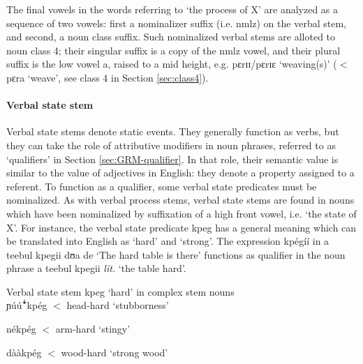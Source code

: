 \begin{exe}
\begin{exe}
\begin{exe}
{\begin{exe}
\begin{exe}
\begin{exe}
\begin{exe}
 The final vowels in the
words referring to `the process of X' are analyzed as a sequence of two
vowels: first a nominalizer suffix (i.e. {\sc nmlz})  on the verbal stem,  and
second,  a noun class suffix.  Such nominalized verbal stems are alloted to
noun class 4;  their singular suffix is a copy of the {\sc nmlz} vowel,
and their  plural suffix is the low vowel {\sls a}, raised to a mid height, e.g.
{\sls pɛrɪɪ}/{\sls pɛrɪɛ} `weaving(s)'  ($<$ {\sls pɛra} `weave', see class 4
in Section \ref{sec:class4}).



\paragraph{Verbal state stem}
\label{sec:GRM-verb-state-stem}

Verbal state stems  denote static events. They generally
function  as verbs, but they can take the role of attributive modifiers in
noun phrases, referred to as  `qualifiers' in Section \ref{sec:GRM-qualifier}.
In that role, their semantic value is similar to the value of adjectives in
English: they denote a property  assigned to a referent.  To function as  a
qualifier, some verbal state predicates must be nominalized. As with verbal 
process stems,  verbal state stems are found in nouns which
have
been nominalized by suffixation of a  high front vowel, i.e. `the state of X'.
For instance, the verbal state predicate {\sls kpeg} has a general meaning 
which 
can be
translated into English as `hard' and `strong'. The expression {\sls kpégíí} 
in
{\sls a teebul kpegii dʊa de} `The hard table is there' functions as qualifier in
the noun phrase {\sls a teebul kpegii} {\it lit.} `the table hard'. 


\ea\label{exːGRM-v-sta-p-hard}{\rm Verbal state stem {\sls kpeg}  `hard' in
complex stem nouns}\\
 
 \ea\label{exːGRM-v-sta-p-hard-head}
{ɲúú{\T ꜜ}kpég} $<$ {\sc head-hard} {\rm `stubborness'} 

 \ex\label{exːGRM-v-sta-p-hard-arm}
{nékpég} $<$ {\sc arm-hard} {\rm `stingy'} 

 \ex\label{exːGRM-v-sta-p-hard-tree}
{dààkpég} $<$ {\sc wood-hard} {\rm `strong wood'}
 
\z 
 \z
 


\end{exe}
\end{exe}
\end{exe}
\end{exe}}
\end{exe}
\end{exe}
\end{exe}
